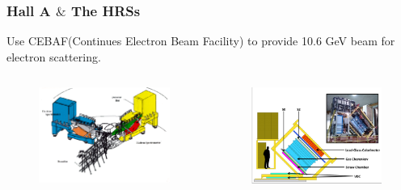 \documentclass{beamer}
\begin{document}
\begin{frame}
\frametitle{Hall A $\&$ The HRSs}

\begin{block}{}
	Use CEBAF(Continues Electron Beam Facility) to provide 10.6 GeV beam for electron scattering. 
\end{block}
\vspace{-20pt}
\begin{columns}
\begin{figure}
	\includegraphics[width=6cm]{../images/Halla_img}
\end{figure}
\begin{figure}
	\includegraphics[width=6cm]{../images/HRS_cartoon}
\end{figure}

\end{columns}
\end{frame}
\end{document}
